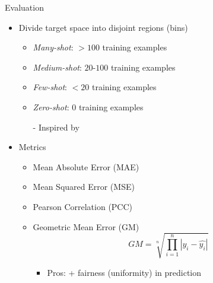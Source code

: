 \begin{frame}{Evaluation}
	\begin{itemize}\setlength\itemsep{1.5em}
		\item<2-> Divide target space into disjoint regions (bins)
		\begin{itemize}
			\item \emph{Many-shot}: $>100$ training examples
			\item \emph{Medium-shot}: $20$-$100$ training examples
			\item \emph{Few-shot}: $<20$ training examples
			\item \emph{Zero-shot}: $0$ training examples
			\item[-] Inspired by \cite{liu2019large}
		\end{itemize}
		\item<3-> Metrics
		\begin{itemize}
			\item Mean Absolute Error (MAE)
			\item Mean Squared Error (MSE)
			\item Pearson Correlation (PCC)
			\item Geometric Mean Error (GM)
			\begin{equation*}
				GM = \sqrt[n]{\prod_{i=1}^n |y_i - \hat{y_i}|}
			\end{equation*}
			\begin{itemize}
				\item Pros: + fairness (uniformity) in prediction
			\end{itemize}
		\end{itemize}
	\end{itemize}
\end{frame}